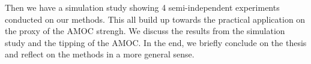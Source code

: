 Then we have a simulation study showing 4 semi-independent experiments conducted on our methods. This all build up towards the practical application on the proxy of the AMOC strengh. We discuss the results from the simulation study and the tipping of the AMOC. In the end, we briefly conclude on the thesis and reflect on the methods in a more general sense. 